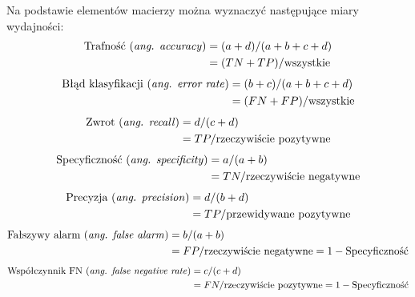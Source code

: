 Na podstawie elementów macierzy można wyznaczyć następujące miary wydajności\cite{HLAVAC}:
\begin{equation}
\label{cm_accuracy} 
\begin{split} 
\text{Trafność (\emph{ang. accuracy})} & = (a + d) / (a + b + c + d) \\ & = (TN+TP) / \text{wszystkie}
\end{split}
\end{equation}
\begin{equation}
\label{cm_error} 
\begin{split} 
\text{Błąd klasyfikacji (\emph{ang. error rate})} & = (b + c) / (a + b + c + d) \\ & = (FN + FP) / \text{wszystkie}
\end{split}
\end{equation}
\begin{equation} 
\label{cm_recall} 
\begin{split} 
\text{Zwrot (\emph{ang. recall})} & = d / (c + d) \\ & = TP / \text{rzeczywiście pozytywne}
\end{split}
\end{equation}
\begin{equation} 
\label{cm_specificity} 
\begin{split} 
\text{Specyficzność (\emph{ang. specificity})} & = a / (a + b) \\ & = TN / \text{rzeczywiście negatywne}
\end{split}
\end{equation}
\begin{equation} 
\label{cm_precision} 
\begin{split} 
\text{Precyzja (\emph{ang. precision})} & = d / (b + d) \\ & = TP / \text{przewidywane pozytywne}
\end{split}
\end{equation}
\begin{equation} 
\label{cm_false_alarm} 
\begin{split} 
\text{Fałszywy alarm (\emph{ang. false alarm})} & = b / (a + b) \\ & = FP / \text{rzeczywiście negatywne} = 1 - \text{Specyficzność}
\end{split}
\end{equation}
\begin{equation} 
\label{cm_fn_rate}
\begin{split} 
\text{Współczynnik FN (\emph{ang. false negative rate})} & = c / (c + d) \\ & =  FN / \text{rzeczywiście pozytywne} = 1 - \text{Specyficzność}
\end{split}
\end{equation}

